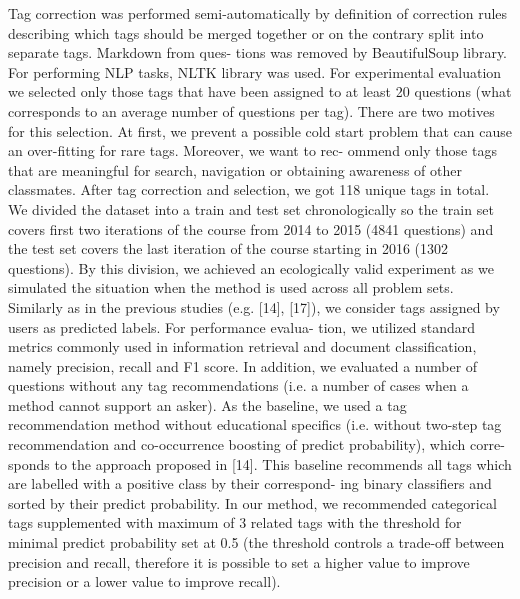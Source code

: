 \documentclass{sig-alternate}
\begin{document}
Tag correction was performed semi-automatically by definition
of correction rules describing which tags should be merged together
or on the contrary split into separate tags. Markdown from ques-
tions was removed by BeautifulSoup library. For performing NLP
tasks, NLTK library was used.
For experimental evaluation we selected only those tags that
have been assigned to at least 20 questions (what corresponds to
an average number of questions per tag). There are two motives for
this selection. At first, we prevent a possible cold start problem that
can cause an over-fitting for rare tags. Moreover, we want to rec-
ommend only those tags that are meaningful for search, navigation
or obtaining awareness of other classmates. After tag correction
and selection, we got 118 unique tags in total.
We divided the dataset into a train and test set chronologically
so the train set covers first two iterations of the course from 2014
to 2015 (4841 questions) and the test set covers the last iteration
of the course starting in 2016 (1302 questions). By this division,
we achieved an ecologically valid experiment as we simulated the
situation when the method is used across all problem sets.
Similarly as in the previous studies (e.g. [14], [17]), we consider
tags assigned by users as predicted labels. For performance evalua-
tion, we utilized standard metrics commonly used in information
retrieval and document classification, namely precision, recall and
F1 score. In addition, we evaluated a number of questions without
any tag recommendations (i.e. a number of cases when a method
cannot support an asker).
As the baseline, we used a tag recommendation method without
educational specifics (i.e. without two-step tag recommendation
and co-occurrence boosting of predict probability), which corre-
sponds to the approach proposed in [14]. This baseline recommends
all tags which are labelled with a positive class by their correspond-
ing binary classifiers and sorted by their predict probability.
In our method, we recommended categorical tags supplemented
with maximum of 3 related tags with the threshold for minimal
predict probability set at 0.5 (the threshold controls a trade-off
between precision and recall, therefore it is possible to set a higher
value to improve precision or a lower value to improve recall).
\end{document}
